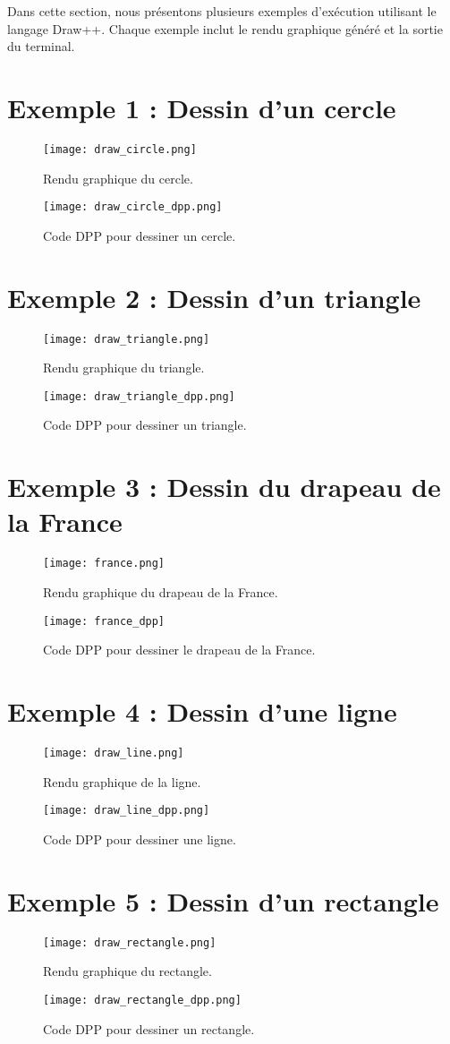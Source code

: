 \documentclass[12pt,a4paper]{report}
\begin{document}
Dans cette section, nous présentons plusieurs exemples d'exécution utilisant le langage Draw++. Chaque exemple inclut le rendu graphique généré et la sortie du terminal.

\section{Exemple 1 : Dessin d'un cercle}
\begin{figure}[H]
    \centering
    \texttt{[image: draw\_circle.png]}
    \caption{Rendu graphique du cercle.}
    \texttt{[image: draw\_circle\_dpp.png]}
    \caption{Code DPP pour dessiner un cercle.}
\end{figure}

\section{Exemple 2 : Dessin d'un triangle}
\begin{figure}[H]
    \centering
    \texttt{[image: draw\_triangle.png]}
    \caption{Rendu graphique du triangle.}
    \texttt{[image: draw\_triangle\_dpp.png]}
    \caption{Code DPP pour dessiner un triangle.}
\end{figure}

\section{Exemple 3 : Dessin du drapeau de la France}
\begin{figure}[H]
    \centering
    \texttt{[image: france.png]}
    \caption{Rendu graphique du drapeau de la France.}
    \texttt{[image: france\_dpp]}
    \caption{Code DPP pour dessiner le drapeau de la France.}
\end{figure}

\section{Exemple 4 : Dessin d'une ligne}
\begin{figure}[H]
    \centering
    \texttt{[image: draw\_line.png]}
    \caption{Rendu graphique de la ligne.}
    \texttt{[image: draw\_line\_dpp.png]}
    \caption{Code DPP pour dessiner une ligne.}
\end{figure}

\section{Exemple 5 : Dessin d'un rectangle}
\begin{figure}[H]
    \centering
    \texttt{[image: draw\_rectangle.png]}
    \caption{Rendu graphique du rectangle.}
    \texttt{[image: draw\_rectangle\_dpp.png]}
    \caption{Code DPP pour dessiner un rectangle.}
\end{figure}
\end{document}
